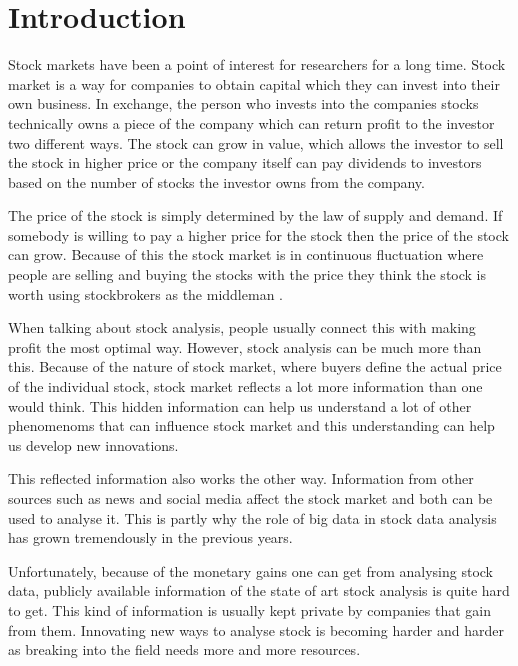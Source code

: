 \chapter{Introduction}
\label{chapter:intro}

Stock markets have been a point of interest for researchers for a long time.
Stock market is a way for companies to obtain capital which they can invest into their own business.
In exchange, the person who invests into the companies stocks technically owns a piece of the company which can return profit to the investor two different ways.
The stock can grow in value, which allows the investor to sell the stock in higher price or the company itself can pay dividends to investors based on the number of stocks the investor owns from the company.

The price of the stock is simply determined by the law of supply and demand. 
If somebody is willing to pay a higher price for the stock then the price of the stock can grow.
Because of this the stock market is in continuous fluctuation where people are selling and buying the stocks with the price they think the stock is worth using stockbrokers as the middleman \cite{person}.

When talking about stock analysis, people usually connect this with making profit the most optimal way.
However, stock analysis can be much more than this.
Because of the nature of stock market, where buyers define the actual price of the individual stock, stock market reflects a lot more information than one would think.
This hidden information can help us understand a lot of other phenomenoms that can influence stock market and this understanding can help us develop new innovations.

This reflected information also works the other way.
Information from other sources such as news and social media affect the stock market and both can be used to analyse it.
This is partly why the role of big data in stock data analysis has grown tremendously in the previous years.

Unfortunately, because of the monetary gains one can get from analysing stock data, publicly available information of the state of art stock analysis is quite hard to get.
This kind of information is usually kept private by companies that gain from them.
Innovating new ways to analyse stock is becoming harder and harder as breaking into the field needs more and more resources.

